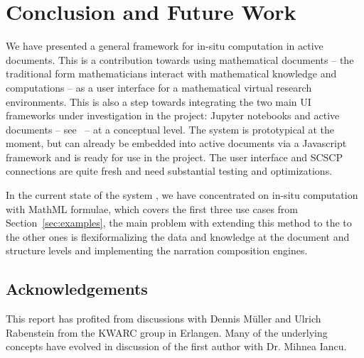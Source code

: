 \section{Conclusion and Future Work}\label{sec:concl}
 
We have presented a general framework for in-situ computation in active documents. This is
a contribution towards using mathematical documents -- the traditional form mathematicians
interact with mathematical knowledge and computations -- as a user interface for a
mathematical virtual research environments. This is also a step towards integrating the
two main UI frameworks under investigation in the \pn project: Jupyter notebooks and
active documents -- see~\cite{ODK-D4.2} -- at a conceptual level. The system is
prototypical at the moment, but can already be embedded into active documents via a
Javascript framework and is ready for use in the \pn project. The user interface and SCSCP
connections are quite fresh and need substantial testing and optimizations.

In the current state of the system , we have concentrated on in-situ computation with
MathML formulae, which covers the first three use cases from Section~\ref{sec:examples},
the main problem with extending this method to the to the other ones is flexiformalizing
the data and knowledge at the document and structure levels and implementing the narration
composition engines. 

\subsection*{Acknowledgements}
This report has profited from discussions with Dennis M\"uller and Ulrich Rabenstein from
the KWARC group in Erlangen. Many of the underlying concepts have evolved in discussion of
the first author with Dr. Mihnea Iancu.


